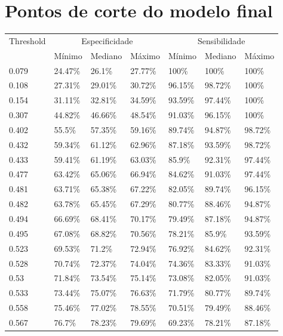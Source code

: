 \documentclass[a4paper,titlepage]{ppgi}\usepackage[]{graphicx}\usepackage[]{color}
\begin{document}
\chapter{Pontos de corte do modelo final}
\label{apendice:lista-pontos-de-corte}



\begin{longtable}{l l l l l l l}
\centering
  Threshold & \multicolumn{3}{c}{Especificidade} & \multicolumn{3}{c}{Sensibilidade} \\ \cline{2-7}
            & \multicolumn{1}{|l}{Mínimo} & Mediano & Máximo & \multicolumn{1}{|l}{Mínimo} & Mediano & \multicolumn{1}{l|}{Máximo} \\
  \hline
  0.079 & 24.47\% & 26.1\% & 27.77\% & 100\% & 100\% & 100\% \\
0.108 & 27.31\% & 29.01\% & 30.72\% & 96.15\% & 98.72\% & 100\% \\
0.154 & 31.11\% & 32.81\% & 34.59\% & 93.59\% & 97.44\% & 100\% \\
0.307 & 44.82\% & 46.66\% & 48.54\% & 91.03\% & 96.15\% & 100\% \\
0.402 & 55.5\% & 57.35\% & 59.16\% & 89.74\% & 94.87\% & 98.72\% \\
0.432 & 59.34\% & 61.12\% & 62.96\% & 87.18\% & 93.59\% & 98.72\% \\
0.433 & 59.41\% & 61.19\% & 63.03\% & 85.9\% & 92.31\% & 97.44\% \\
0.477 & 63.42\% & 65.06\% & 66.94\% & 84.62\% & 91.03\% & 97.44\% \\
0.481 & 63.71\% & 65.38\% & 67.22\% & 82.05\% & 89.74\% & 96.15\% \\
0.482 & 63.78\% & 65.45\% & 67.29\% & 80.77\% & 88.46\% & 94.87\% \\
0.494 & 66.69\% & 68.41\% & 70.17\% & 79.49\% & 87.18\% & 94.87\% \\
0.495 & 67.08\% & 68.82\% & 70.56\% & 78.21\% & 85.9\% & 93.59\% \\
0.523 & 69.53\% & 71.2\% & 72.94\% & 76.92\% & 84.62\% & 92.31\% \\
0.528 & 70.74\% & 72.37\% & 74.04\% & 74.36\% & 83.33\% & 91.03\% \\
0.53 & 71.84\% & 73.54\% & 75.14\% & 73.08\% & 82.05\% & 91.03\% \\
0.533 & 73.44\% & 75.07\% & 76.63\% & 71.79\% & 80.77\% & 89.74\% \\
0.558 & 75.46\% & 77.02\% & 78.55\% & 70.51\% & 79.49\% & 88.46\% \\
0.567 & 76.7\% & 78.23\% & 79.69\% & 69.23\% & 78.21\% & 87.18\% \\

\end{longtable}
\end{document}
